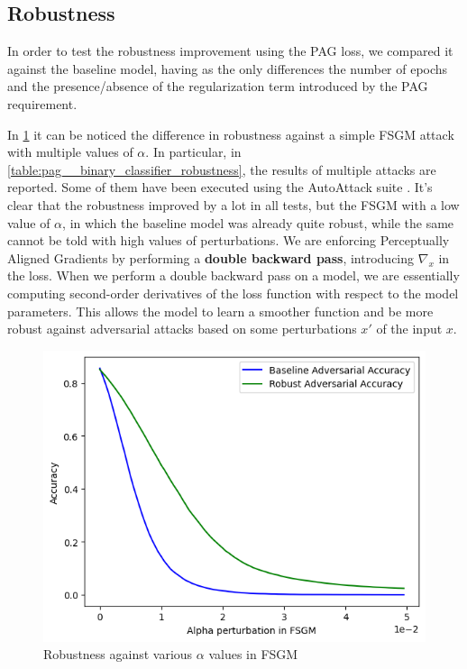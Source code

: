 \documentclass[../thesis.tex]{subfiles}
\begin{document}
\subsection{Robustness}
In order to test the robustness improvement using the PAG loss,
we compared it against the baseline model, having as the only differences the number of epochs and the presence/absence of the regularization term introduced by the PAG requirement.

In \cref{fig:pag__binary_sentences_fsgm} it can be noticed the difference in robustness against a simple FSGM attack with multiple values of $\alpha$.
In particular, in \cref{table:pag__binary_classifier_robustness}, the results of multiple attacks are reported. Some of them have been executed using the AutoAttack suite \citep{croce2020reliableautoattack}.
It's clear that the robustness improved by a lot in all tests, but the FSGM with a low value of $\alpha$, in which the baseline model was already quite robust, while the same cannot be told with high values of perturbations.
We are enforcing Perceptually Aligned Gradients by performing a \textbf{double backward pass}, introducing $\nabla_x$ in the loss. When we perform a double backward pass on a model, we are essentially computing second-order derivatives of the loss function with respect to the model parameters.
This allows the model to learn a smoother function and be more robust against adversarial attacks based on some perturbations $x'$ of the input $x$.


\begin{figure}[ht]
    \centering
    \includegraphics[width=0.5\linewidth]{assets/pag/binary_classifier/fsgm.png}
    \caption{Robustness against various $\alpha$ values in FSGM}
    \label{fig:pag__binary_sentences_fsgm}
\end{figure}
\end{document}
